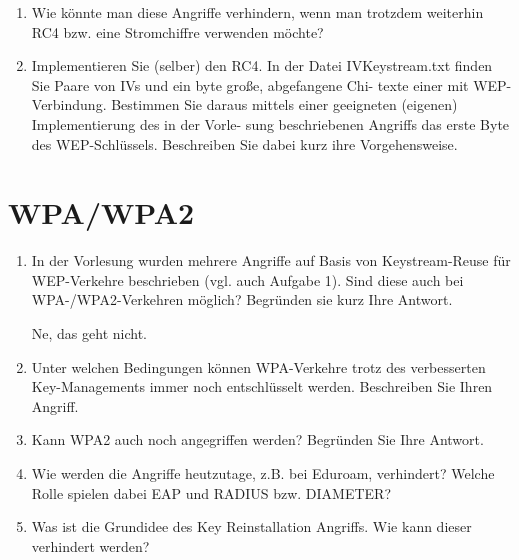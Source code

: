 \documentclass[12pt,a4paper]{article}
\newenvironment{exercise}
	{\begin{enumerate}[label=\bfseries\alph*).]\bfseries}
{\end{enumerate}}
\newenvironment{answer}{\par\normalfont}{}
\begin{document}
\begin{exercise}
\begin{answer}
		Ein Angreifer kann eine beliebige Nachricht wählen, die CRC-Prüfsumme dazu bilden,
		das Ganze mit dem bekannten Schlüsselstrom XOR-verknüpfen, und den passenden
		IV dahinter anfügen.\\
		Ein Angreifer kann auch gezielt die Bits der IP-Zieladresse so abändern, dass das Paket in ein vom Angreifer kontrolliertes Netzwerk umgeleitet wird. Er kann dann die andere Headerfeld so abändern, dass die Prüfsumme gleich beleibt. AP wird die Paket dann entschlüsselt und umleitet.
		\end{answer}
		\item  Wie könnte man diese Angriffe verhindern, wenn man trotzdem weiterhin RC4 bzw. eine
		Stromchiffre verwenden möchte?
		\item Implementieren Sie (selber) den RC4.
		In der Datei IVKeystream.txt finden Sie Paare von IVs und ein byte große, abgefangene Chi-
		texte einer mit WEP-Verbindung.
		Bestimmen Sie daraus mittels einer geeigneten (eigenen) Implementierung des in der Vorle-
		sung beschriebenen Angriffs das erste Byte des WEP-Schlüssels. Beschreiben Sie dabei kurz
		ihre Vorgehensweise.
    	\end{exercise}
    
    \section{WPA/WPA2}
    	\begin{exercise}
    		\item In der Vorlesung wurden mehrere Angriffe auf Basis von Keystream-Reuse für WEP-Verkehre beschrieben (vgl. auch Aufgabe 1). Sind diese auch bei WPA-/WPA2-Verkehren möglich? Begründen sie kurz Ihre Antwort.
    			\begin{answer}
    				Ne, das geht nicht.
    			\end{answer}
    		\item Unter welchen Bedingungen können WPA-Verkehre trotz des verbesserten Key-Managements immer noch entschlüsselt werden. Beschreiben Sie Ihren Angriff.
    		\item Kann WPA2 auch noch angegriffen werden? Begründen Sie Ihre Antwort.
    		\item Wie werden die Angriffe heutzutage, z.B. bei Eduroam, verhindert? Welche Rolle spielen dabei EAP und RADIUS bzw. DIAMETER?
    		\item Was ist die Grundidee des Key Reinstallation Angriffs. Wie kann dieser verhindert werden?
    		
    	\end{exercise}
\end{document}
